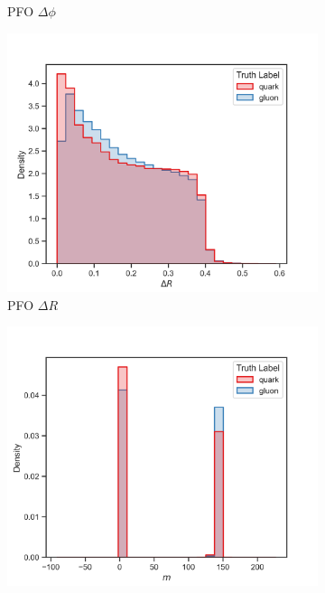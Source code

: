 \begin{figure}[!htb]
\begin{subfigure}[t]{0.45\textwidth}
        \caption{PFO $\Delta\phi$}
        \label{fig:app_pfo_deltaPhi}
    \end{subfigure}
    \begin{subfigure}[t]{0.45\textwidth}
        \includegraphics[width=\linewidth]{src/plots/distributions/PFOs/deltaR.png}
        \caption{PFO $\Delta R$}
        \label{fig:app_pfo_deltaR}
    \end{subfigure}
    \begin{subfigure}[t]{0.45\textwidth}
        \includegraphics[width=\linewidth]{src/plots/distributions/PFOs/m.png}

\end{subfigure}
\end{figure}
